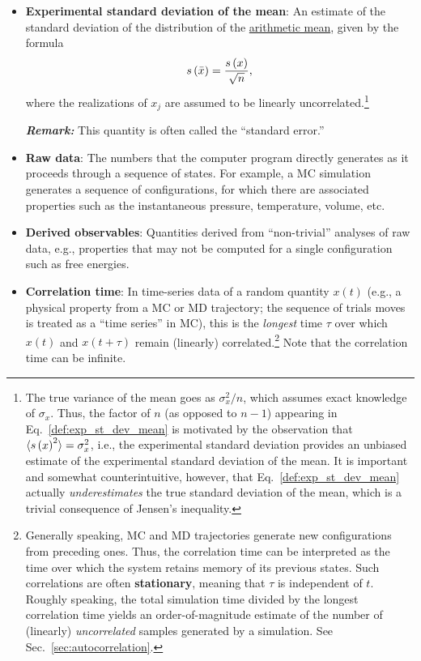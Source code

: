 \begin{itemize}
\item {\bf Experimental standard deviation of the mean}: An estimate of the standard deviation of the distribution of the \hyperref[def:arith_mean]{arithmetic mean}, given by the formula
  \begin{equation}
    s\left( \bar{x} \right) = \dfrac{s\left( x \right)}{\sqrt{n}}, \label{def:exp_st_dev_mean}
  \end{equation}
  where the realizations of $x_j$ are assumed to be linearly uncorrelated.\footnote{The true variance of the mean goes as $\sigma_x^2/n$, which assumes exact knowledge of $\sigma_x$.  Thus, the factor of $n$ (as opposed to $n-1$) appearing in Eq.~\eqref{def:exp_st_dev_mean} is motivated by the observation that $\langle s\left( x \right)^2 \rangle = \sigma_x^2$, i.e., the experimental standard deviation provides an unbiased estimate of the experimental standard deviation of the mean.  It is important and somewhat counterintuitive, however, that Eq.~\eqref{def:exp_st_dev_mean} actually {\it underestimates} the true standard deviation of the mean, which is a trivial consequence of Jensen's inequality. }

\smallskip
\textbf{\textit{Remark:}} This quantity is often called the ``standard error.''


\item {\bf Raw data}: The numbers that the computer program directly generates as it proceeds through a sequence of states.
For example, a MC simulation generates a sequence of configurations, for which there are associated properties such as the instantaneous pressure, temperature, volume, etc.
\label{def:raw_data}
\item {\bf Derived observables}: Quantities derived from ``non-trivial'' analyses of raw data, e.g., properties that may not be computed for a single configuration such as free energies.
  \label{def:deriv_obs}


\item {\bf Correlation time}: In time-series data of a random quantity $x(t)$ (e.g., a physical property from a MC or MD trajectory; the sequence of trials moves is treated as a ``time series'' in MC), this is the {\it longest} time $\tau$ over which $x(t)$ and $x(t+\tau)$ remain (linearly) correlated.\footnote{Generally speaking, MC and MD trajectories generate new configurations from preceding ones.
Thus, the correlation time can be interpreted as the time over which the system retains memory of its previous states.
Such correlations are often {\bf stationary}, meaning that $\tau$ is independent of $t$.
Roughly speaking, the total simulation time divided by the longest correlation time yields an order-of-magnitude estimate of the number of (linearly) {\it uncorrelated} samples generated by a simulation. See Sec.~\ref{sec:autocorrelation}.}  Note that the correlation time can be infinite.
\label{def:corr_time}


\end{itemize}
